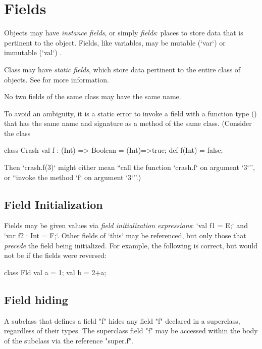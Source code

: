 \section{Fields}
\label{FieldDefinitions}

Objects may have {\em instance fields}, or simply {\em fields}: places to
store data that is pertinent to the object. Fields, like variables, may be
mutable (\xcd`var`) or immutable (\xcd`val`)
.

Class may have {\em static fields}, which store data pertinent to the
entire class of objects.  
See  for more information.

No two fields of the same class may have the same name.

To avoid an ambiguity, it is a static error to invoke  a field with a function
type () that has 
the same name and signature  as a method of the same class.  
(Consider the class 
\begin{xten}
class Crash {
  val f : (Int) => Boolean = (Int)=>true;
  def f(Int) = false;
}
\end{xten}
\noindent
Then \xcd`crash.f(3)` might either mean ``call the function \xcd`crash.f` on
argument \xcd`3`'', or ``invoke the method \xcd`f` on argument \xcd`3`''.)

\subsection{Field Initialization}

Fields may be given values via {\em field initialization expressions}:
\xcd`val f1 = E;` and \xcd`var f2 : Int = F;`. Other fields of \xcd`this` may
be referenced, but only those that {\em precede} the field being initialized.
For example, the following is correct, but would not be if the fields were
reversed:

\begin{xten}
class Fld{
  val a = 1;
  val b = 2+a;
}
\end{xten}
%


\subsection{Field hiding}

A subclass that defines a field \xcd"f" hides any field \xcd"f"
declared in a superclass, regardless of their types.  The
superclass field \xcd"f" may be accessed within the body of
the subclass via the reference \xcd"super.f".

